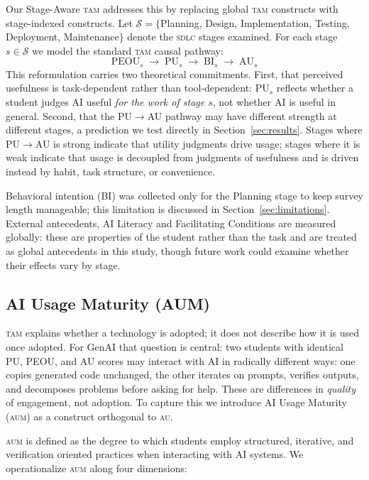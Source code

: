 \documentclass[sigconf,anonymous]{acmart}
\newcommand{\AUM}{\textsc{aum}\xspace}
\newcommand{\AU}{\textsc{au}\xspace}
\newcommand{\TAM}{\textsc{tam}\xspace}
\newcommand{\SDLC}{\textsc{sdlc}\xspace}
\newcommand{\GenAI}{GenAI\xspace}
\begin{document}
Our Stage-Aware \TAM addresses this by replacing global \TAM
constructs with stage-indexed constructs. Let $\mathcal{S} = \{$Planning,
Design, Implementation, Testing, Deployment, Maintenance$\}$ denote
the \SDLC stages examined. For each stage $s \in \mathcal{S}$ we
model the standard \TAM causal pathway:
\[
  \text{PEOU}_s \;\rightarrow\; \text{PU}_s \;\rightarrow\;
  \text{BI}_s \;\rightarrow\; \text{AU}_s
\]
This reformulation carries two theoretical commitments. First, that
perceived usefulness is task-dependent rather than tool-dependent:
PU$_s$ reflects whether a student judges AI useful \emph{for the work
of stage $s$}, not whether AI is useful in general. Second, that the
PU$\rightarrow$AU pathway may have different strength at different
stages, a prediction we test directly in Section~\ref{sec:results}.
Stages where PU$\rightarrow$AU is strong indicate that utility
judgments drive usage; stages where it is weak indicate that usage
is decoupled from judgments of usefulness and is driven instead by
habit, task structure, or convenience.

Behavioral intention (BI) was collected only for the Planning stage
to keep survey length manageable; this limitation is discussed in
Section~\ref{sec:limitations}. External antecedents, AI Literacy and
Facilitating Conditions are measured globally: these are properties
of the student rather than the task and are treated as global antecedents in this study, though future work could examine whether their effects vary by stage.

\subsection{AI Usage Maturity (AUM)}
\TAM explains whether a technology is adopted; it does not describe
how it is used once adopted. For \GenAI that question is central: two
students with identical PU, PEOU, and AU scores may interact with AI
in radically different ways: one copies generated code unchanged,
the other iterates on prompts, verifies outputs, and decomposes
problems before asking for help. These are differences in
\emph{quality} of engagement, not adoption. To capture this we
introduce AI Usage Maturity (\AUM) as a construct orthogonal to \AU.

\AUM is defined as the degree to which students employ structured,
iterative, and verification oriented practices when interacting with
AI systems. We operationalize \AUM along four dimensions:
\end{document}
